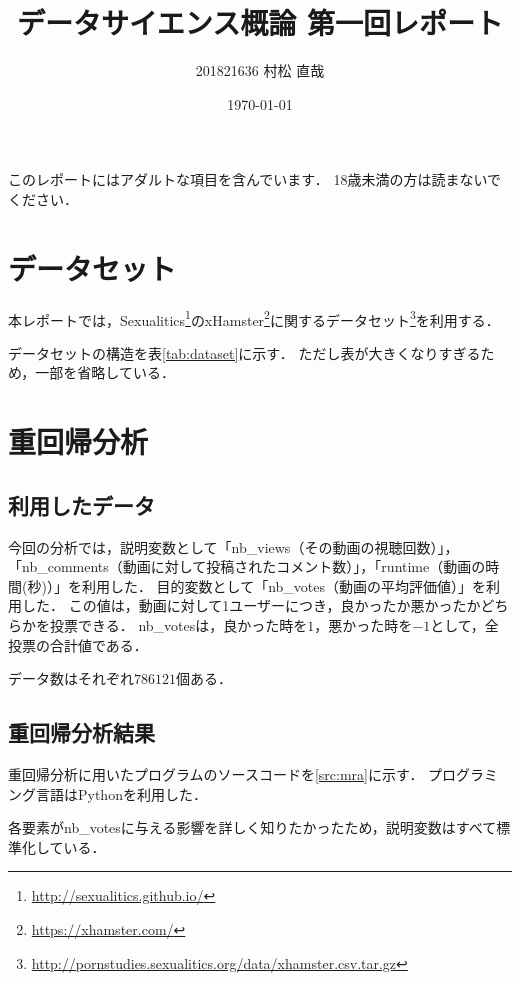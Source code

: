 \documentclass[uplatex]{jsarticle}
\begin{document}
\title{\huge データサイエンス概論 第一回レポート}
\author{201821636 村松 直哉}
\date{\today}
\maketitle

このレポートにはアダルトな項目を含んでいます．
18歳未満の方は読まないでください．

\section{データセット}

本レポートでは，Sexualitics\footnote{\url{http://sexualitics.github.io/}}のxHamster\footnote{\url{https://xhamster.com/}}に関するデータセット\footnote{\url{http://pornstudies.sexualitics.org/data/xhamster.csv.tar.gz}}を利用する．

データセットの構造を表\ref{tab:dataset}に示す．
ただし表が大きくなりすぎるため，一部を省略している．


\section{重回帰分析}

\subsection{利用したデータ}

今回の分析では，説明変数として「nb\_views（その動画の視聴回数）」，「nb\_comments（動画に対して投稿されたコメント数）」，「runtime（動画の時間(秒)）」を利用した．
目的変数として「nb\_votes（動画の平均評価値）」を利用した．
この値は，動画に対して1ユーザーにつき，良かったか悪かったかどちらかを投票できる．
nb\_votesは，良かった時を$1$，悪かった時を$-1$として，全投票の合計値である．

データ数はそれぞれ$786121$個ある．

\subsection{重回帰分析結果}

重回帰分析に用いたプログラムのソースコードを\ref{src:mra}に示す．
プログラミング言語はPythonを利用した．

各要素がnb\_votesに与える影響を詳しく知りたかったため，説明変数はすべて標準化している．


\end{document}
